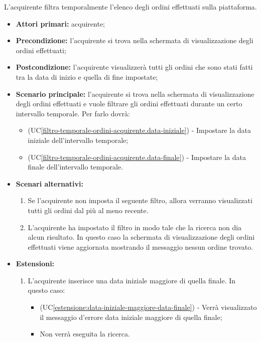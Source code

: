 L'acquirente filtra temporalmente l'elenco degli ordini effettuati sulla piattaforma.
\begin{itemize}
    \item \textbf{Attori primari:} acquirente;
    \item \textbf{Precondizione:} l'acquirente si trova nella schermata di visualizzazione degli ordini effettuati;
    \item \textbf{Postcondizione:} l'acquirente visualizzerà tutti gli ordini che sono stati fatti tra la data di inizio e quella di fine impostate;
    \item \textbf{Scenario principale:} l'acquirente si trova nella schermata di visualizzazione degli ordini effettuati e vuole filtrare gli ordini effettuati durante un certo intervallo temporale. Per farlo dovrà:
    \begin{itemize}
        \item (UC\ref{filtro-temporale-ordini-acquirente.data-iniziale}) - Impostare la data iniziale dell'intervallo temporale;
        \item (UC\ref{filtro-temporale-ordini-acquirente.data-finale}) - Impostare la data finale dell'intervallo temporale.
    \end{itemize}
	\item \textbf{Scenari alternativi:}
	\begin{enumerate}[label=\lett]
		\item Se l'acquirente non imposta il seguente filtro, allora verranno visualizzati tutti gli ordini dal più al meno recente.
		\item L'acquirente ha impostato il filtro in modo tale che la ricerca non dia alcun risultato. In questo caso la schermata di visualizzazione degli ordini effettuati viene aggiornata mostrando il messaggio nessun ordine trovato.
	\end{enumerate}
    \item \textbf{Estensioni:}
    \begin{enumerate}[label=\lett]
        \item L'acquirente inserisce una data iniziale maggiore di quella finale. In questo caso:
        \begin{itemize}
            \item (UC\ref{estensione:data-iniziale-maggiore-data-finale}) - Verrà visualizzato il messaggio d'errore data iniziale maggiore di quella finale;
            \item Non verrà eseguita la ricerca.
        \end{itemize}
    \end{enumerate}
\end{itemize}

